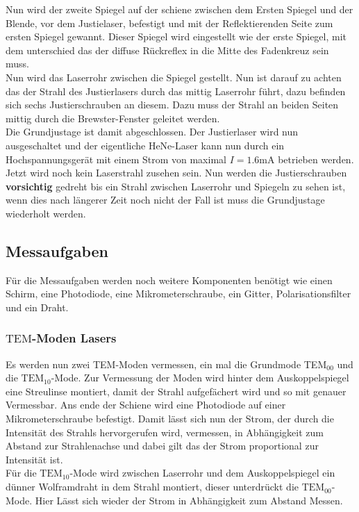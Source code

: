 Nun wird der zweite Spiegel auf der schiene zwischen dem Ersten Spiegel und der Blende, vor dem Justielaser, befestigt und mit der Reflektierenden Seite zum ersten Spiegel gewannt. Dieser Spiegel wird eingestellt wie der erste Spiegel, mit dem unterschied das der diffuse Rückreflex in die Mitte des Fadenkreuz sein muss.\\
Nun wird das Laserrohr zwischen die Spiegel gestellt. Nun ist darauf zu achten das der Strahl des Justierlasers durch das mittig Laserrohr führt, dazu befinden sich sechs Justierschrauben an diesem. Dazu muss der Strahl an beiden Seiten mittig durch die Brewster-Fenster geleitet werden.\\
Die Grundjustage ist damit abgeschlossen. Der Justierlaser wird nun ausgeschaltet und der eigentliche HeNe-Laser kann nun durch ein Hochspannungsgerät mit einem Strom von maximal $I=1.6$mA betrieben werden. Jetzt wird noch kein Laserstrahl zusehen sein. Nun werden die Justierschrauben \textbf{vorsichtig} gedreht bis ein Strahl zwischen Laserrohr und Spiegeln zu sehen ist, wenn dies nach längerer Zeit noch nicht der Fall ist muss die Grundjustage wiederholt werden.\\


\subsection{Messaufgaben}
Für die Messaufgaben werden noch weitere Komponenten benötigt wie einen Schirm, eine Photodiode, eine Mikrometerschraube, ein Gitter, Polarisationsfilter und ein Draht.
\subsubsection{$\mathrm{TEM}$-Moden Lasers}
Es werden nun zwei TEM-Moden vermessen, ein mal die Grundmode TEM${}_{00}$ und die $\mathrm{TEM}_{10}$-Mode. Zur Vermessung der Moden wird hinter dem Auskoppelspiegel eine Streulinse montiert, damit der Strahl aufgefächert wird und so mit genauer Vermessbar. Ans ende der Schiene wird eine Photodiode auf einer Mikrometerschraube befestigt. Damit lässt sich nun der Strom, der durch die Intensität des Strahls hervorgerufen wird, vermessen, in Abhängigkeit zum Abstand zur Strahlenachse und dabei gilt das der Strom proportional zur Intensität ist. \\
Für die $\mathrm{TEM}_{10}$-Mode wird zwischen Laserrohr und dem Auskoppelspiegel ein dünner Wolframdraht in dem Strahl montiert, dieser unterdrückt die $\mathrm{TEM}_{00}$-Mode. Hier Lässt sich wieder der Strom in Abhängigkeit zum Abstand Messen.
